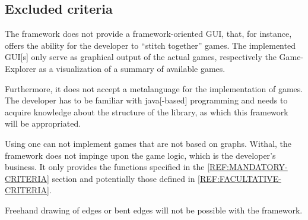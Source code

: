 \subsection{Excluded criteria}
The {\graphioli} framework does not provide a framework-oriented \gls{GUI}, that, for instance, offers the ability for the developer to ``stitch together'' games. The implemented \gls{GUI}[s] only serve as graphical output of the actual games, respectively the Game-Explorer as a visualization of a summary of available games.\par
Furthermore, it does not accept a \gls{metalanguage} for the implementation of games. The \gls{developer} has to be familiar with \Gls{java}[-based] programming and needs to acquire knowledge about the structure of the \gls{library}, as which this framework will be appropriated.\par
Using {\graphioli} one can not implement \glspl{game} that are not based on \glspl{graph}. Withal, the framework does not impinge upon the game logic, which is the developer's business. It only provides the functions specified in the \ref{REF:MANDATORY-CRITERIA} section and potentially those defined in \ref{REF:FACULTATIVE-CRITERIA}.\par
Freehand drawing of \glspl{edge} or bent edges will not be possible with the {\graphioli} framework.\par